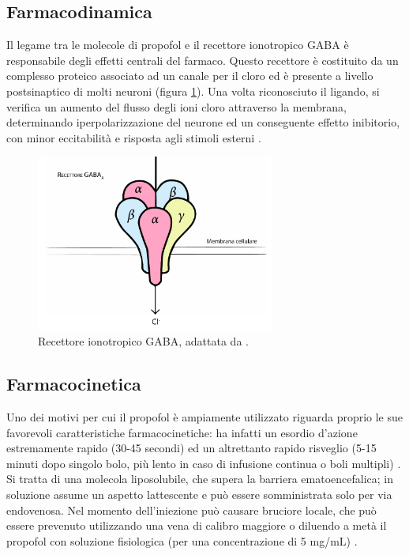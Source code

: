 \subsection*{Farmacodinamica}

Il legame tra le molecole di propofol e il recettore ionotropico GABA è responsabile degli effetti centrali del farmaco. Questo recettore è costituito da un complesso proteico associato ad un canale per il cloro ed è presente a livello postsinaptico di molti neuroni (figura \ref{fig:GABAps}). Una volta riconosciuto il ligando, si verifica un aumento del flusso degli ioni cloro attraverso la membrana, determinando iperpolarizzazione del neurone ed un conseguente effetto inibitorio, con minor eccitabilità e risposta agli stimoli esterni \cite{Propofol2015}.

\bigskip

\begin{figure}[h]
    \centering
    \includegraphics[width=0.7\textwidth]{Figure/GABAill.pdf}
    \caption{Recettore ionotropico GABA, adattata da \cite{vinkers2012}.}
    \label{fig:GABAps}
\end{figure}

\subsection*{Farmacocinetica}

Uno dei motivi per cui il propofol è ampiamente utilizzato riguarda proprio le sue favorevoli caratteristiche farmacocinetiche: ha infatti un esordio d'azione estremamente rapido (30-45 secondi) ed un altrettanto rapido risveglio (5-15 minuti dopo singolo bolo, più lento in caso di infusione continua o boli multipli) \cite{Simeupsedazione, Uptodatepharmacology}. Si tratta di una molecola liposolubile, che supera la barriera ematoencefalica; in soluzione assume un aspetto lattescente e può essere somministrata solo per via endovenosa. Nel momento dell'iniezione può causare bruciore locale, che può essere prevenuto utilizzando una vena di calibro maggiore o diluendo a metà il propofol con soluzione fisiologica (per una concentrazione di 5 mg/mL) \cite{Simeupsedazione}. 

